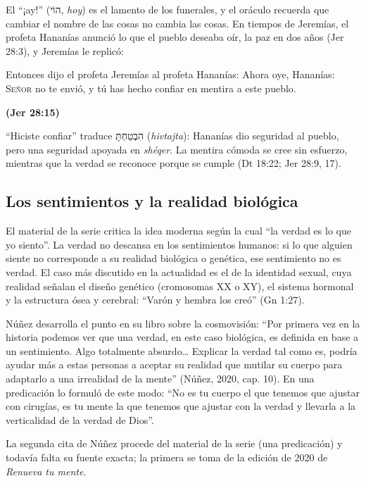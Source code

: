 \documentclass[11pt,letterpaper]{article}
\newcommand{\heb}[1]{\mbox{\foreignlanguage{hebrew}{#1}}}
\newcommand{\SENOR}{\textsc{Señor}}
\newcommand{\fuente}[1]{\par\hfill{\upshape\bfseries\small\textcolor{azul}{#1}}}
\begin{document}
El ``¡ay!'' (\heb{הוֹי}, \emph{hoy}) es el lamento de los funerales, y el oráculo recuerda que cambiar el nombre de las cosas no cambia las cosas. En tiempos de Jeremías, el profeta Hananías anunció lo que el pueblo deseaba oír, la paz en dos años (Jer 28:3), y Jeremías le replicó:

\begin{cita}Entonces dijo el profeta Jeremías al profeta Hananías: Ahora oye, Hananías: \SENOR{} no te envió, y tú has hecho confiar en mentira a este pueblo.\fuente{(Jer 28:15)}\end{cita}

``Hiciste confiar'' traduce \heb{הִבְטַחְתָּ} (\emph{hivtajta}): Hananías dio seguridad al pueblo, pero una seguridad apoyada en \emph{shéqer}. La mentira cómoda se cree sin esfuerzo, mientras que la verdad se reconoce porque se cumple (Dt 18:22; Jer 28:9, 17).

\subsection{Los sentimientos y la realidad biológica}
El material de la serie critica la idea moderna según la cual ``la verdad es lo que yo siento''. La verdad no descansa en los sentimientos humanos: si lo que alguien siente no corresponde a su realidad biológica o genética, ese sentimiento no es verdad. El caso más discutido en la actualidad es el de la identidad sexual, cuya realidad señalan el diseño genético (cromosomas XX o XY), el sistema hormonal y la estructura ósea y cerebral: ``Varón y hembra los creó'' (Gn 1:27).

Núñez desarrolla el punto en su libro sobre la cosmovisión: ``Por primera vez en la historia podemos ver que una verdad, en este caso biológica, es definida en base a un sentimiento. Algo totalmente absurdo\ldots{} Explicar la verdad tal como es, podría ayudar más a estas personas a aceptar su realidad que mutilar su cuerpo para adaptarlo a una irrealidad de la mente'' (Núñez, 2020, cap. 10). En una predicación lo formuló de este modo: ``No es tu cuerpo el que tenemos que ajustar con cirugías, es tu mente la que tenemos que ajustar con la verdad y llevarla a la verticalidad de la verdad de Dios''.

\begin{nota}[Precisión]
La segunda cita de Núñez procede del material de la serie (una predicación) y todavía falta su fuente exacta; la primera se toma de la edición de 2020 de \emph{Renueva tu mente}.
\end{nota}
\end{document}
